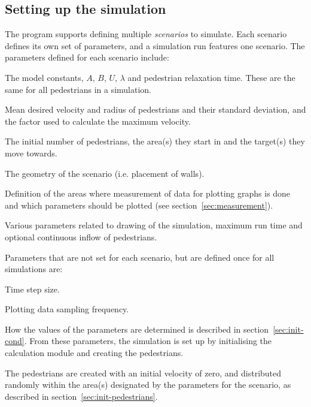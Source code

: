 \subsection{Setting up the simulation}
The program supports defining multiple \emph{scenarios} to simulate. Each 
scenario defines its own set of parameters, and a simulation run features one 
scenario. The parameters defined for each scenario include:

\begin{itemize*}
    \item The model constants, $A$, $B$, $U$, $\lambda$ and pedestrian relaxation 
        time. These are the same for all pedestrians in a simulation.
    \item Mean desired velocity and radius of pedestrians and their standard 
        deviation, and the factor used to calculate the maximum velocity.
    \item The initial number of pedestrians, the area(s) they start in and the 
        target(s) they move towards.
    \item The geometry of the scenario (i.e. placement of walls).
    \item Definition of the areas where measurement of data for plotting 
        graphs is done and which parameters should be plotted (see 
        section~\ref{sec:measurement}).
    \item Various parameters related to drawing of the simulation, maximum run 
        time and optional continuous inflow of pedestrians.
\end{itemize*}

Parameters that are not set for each scenario, but are defined once for all 
simulations are:

\begin{itemize*}
    \item Time step size.
    \item Plotting data sampling frequency.
\end{itemize*}

How the values of the parameters are determined is described in 
section~\ref{sec:init-cond}. From these parameters, the simulation is set up 
by initialising the calculation module and creating the pedestrians.

The pedestrians are created with an initial velocity of zero, and distributed 
randomly within the area(s) designated by the parameters for the scenario, as 
described in section~\ref{sec:init-pedestrians}. 

